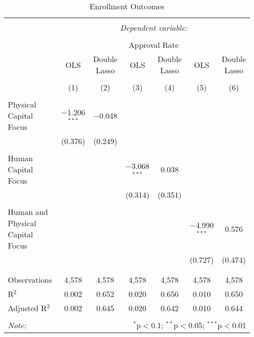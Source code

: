 
\begin{table}[!htbp] \centering 
  \caption{Enrollment Outcomes} 
  \label{} 
\begin{tabular}{@{\extracolsep{5pt}}lcccccc} 
\\[-1.8ex]\hline 
\hline \\[-1.8ex] 
 & \multicolumn{6}{c}{\textit{Dependent variable:}} \\ 
\cline{2-7} 
\\[-1.8ex] & \multicolumn{6}{c}{Approval Rate} \\ 
 & OLS & Double Lasso & OLS & Double Lasso & OLS & Double Lasso \\ 
\\[-1.8ex] & (1) & (2) & (3) & (4) & (5) & (6)\\ 
\hline \\[-1.8ex] 
 Physical Capital Focus & $-$1.206$^{***}$ & $-$0.048 &  &  &  &  \\ 
  & (0.376) & (0.249) &  &  &  &  \\ 
  & & & & & & \\ 
 Human Capital Focus &  &  & $-$3.068$^{***}$ & 0.038 &  &  \\ 
  &  &  & (0.314) & (0.351) &  &  \\ 
  & & & & & & \\ 
 Human and Physical Capital Focus &  &  &  &  & $-$4.990$^{***}$ & 0.576 \\ 
  &  &  &  &  & (0.727) & (0.474) \\ 
  & & & & & & \\ 
\hline \\[-1.8ex] 
Observations & 4,578 & 4,578 & 4,578 & 4,578 & 4,578 & 4,578 \\ 
R$^{2}$ & 0.002 & 0.652 & 0.020 & 0.656 & 0.010 & 0.650 \\ 
Adjusted R$^{2}$ & 0.002 & 0.645 & 0.020 & 0.642 & 0.010 & 0.644 \\ 
\hline 
\hline \\[-1.8ex] 
\textit{Note:}  & \multicolumn{6}{r}{$^{*}$p$<$0.1; $^{**}$p$<$0.05; $^{***}$p$<$0.01} \\ 
\end{tabular} 
\end{table} 
